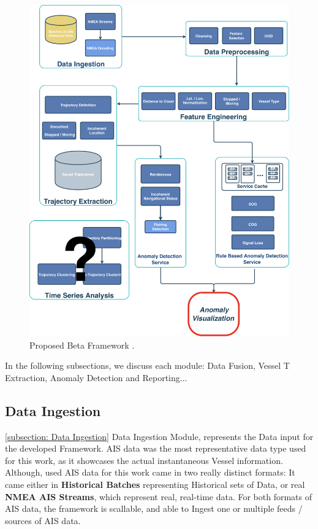 \begin{figure}[H]
	\centering
	\includegraphics[scale = .35]{figures/Ch3/Framework.pdf}
    \caption{Proposed Beta Framework .}
    \label{fig:Framework}
\end{figure}

In the following subsections, we discuss each module: Data Fusion, Vessel T Extraction, Anomaly Detection and Reporting...

\subsection{Data Ingestion}
\ref{subsection: Data Ingestion}
Data Ingestion Module, represents the Data input for the developed Framework. AIS data was the most representative data type used for this work, as it showcases the actual instantaneous Vessel information.
Although, used AIS data for this work came in two really distinct formats: It came either in \textbf{Historical Batches} representing Historical sets of Data, or real \textbf{NMEA AIS Streams}, which represent real, real-time data. For both formats of AIS data, the framework is scallable, and able to Ingest one or multiple feeds / sources of AIS data.


